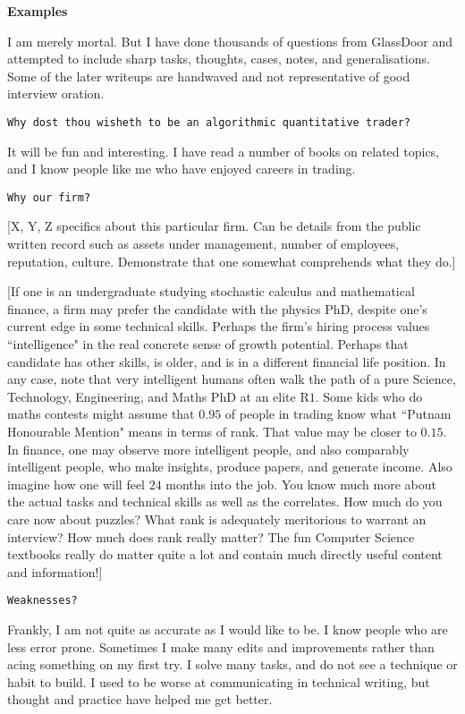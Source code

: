 \textbf{Examples}

I am merely mortal. But I have done thousands of questions from GlassDoor and attempted to include sharp tasks, thoughts, cases, notes, and generalisations. Some of the later writeups are handwaved and not representative of good interview oration.

\texttt{Why dost thou wisheth to be an algorithmic quantitative trader?}

It will be fun and interesting. I have read a number of books on related topics, and I know people like me who have enjoyed careers in trading.

\texttt{Why our firm?}

[X, Y, Z specifics about this particular firm. Can be details from the public written record such as assets under management, number of employees, reputation, culture. Demonstrate that one somewhat comprehends what they do.]

[If one is an undergraduate studying stochastic calculus and mathematical finance, a firm may prefer the candidate with the physics PhD, despite one's current edge in some technical skills. Perhaps the firm's hiring process values ``intelligence" in the real concrete sense of growth potential. Perhaps that candidate has other skills, is older, and is in a different financial life position. In any case, note that very intelligent humans often walk the path of a pure Science, Technology, Engineering, and Maths PhD at an elite R$1$. Some kids who do maths contests might assume that $0.95$ of people in trading know what ``Putnam Honourable Mention" means in terms of rank. That value may be closer to $0.15$. In finance, one may observe more intelligent people, and also comparably intelligent people, who make insights, produce papers, and generate income. Also imagine how one will feel $24$ months into the job. You know much more about the actual tasks and technical skills as well as the correlates. How much do you care now about puzzles? What rank is adequately meritorious to warrant an interview? How much does rank really matter? The fun Computer Science textbooks really do matter quite a lot and contain much directly useful content and information!]

\texttt{Weaknesses?}

Frankly, I am not quite as accurate as I would like to be. I know people who are less error prone. Sometimes I make many edits and improvements rather than acing something on my first try. I solve many tasks, and do not see a technique or habit to build. I used to be worse at communicating in technical writing, but thought and practice have helped me get better.

